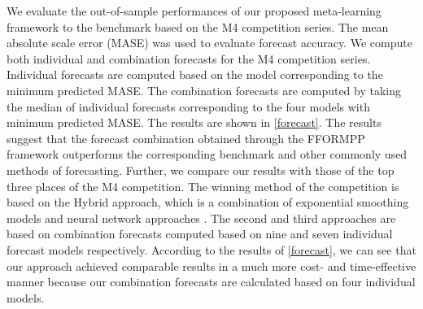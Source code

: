 \documentclass[11pt,a4paper,]{article}
\begin{document}
We evaluate the out-of-sample performances of our proposed meta-learning framework to the benchmark based on the M4 competition series. The mean absolute scale error (MASE) \autocite{hyndman2006another} was used to evaluate forecast accuracy. We compute both individual and combination forecasts for the M4 competition series. Individual forecasts are computed based on the model corresponding to the minimum predicted MASE. The combination forecasts are computed by taking the median of individual forecasts corresponding to the four models with minimum predicted MASE. The results are shown in \autoref{forecast}. The results suggest that the forecast combination obtained through the FFORMPP framework outperforms the corresponding benchmark and other commonly used methods of forecasting. Further, we compare our results with those of the top three places of the M4 competition. The winning method of the competition is based on the Hybrid approach, which is a combination of exponential smoothing models and neural network approaches \autocite{makridakis2018m4}. The second and third approaches are based on combination forecasts computed based on nine and seven individual forecast models respectively. According to the results of \autoref{forecast}, we can see that our approach achieved comparable results in a much more cost- and time-effective manner because our combination forecasts are calculated based on four individual models.
\end{document}
